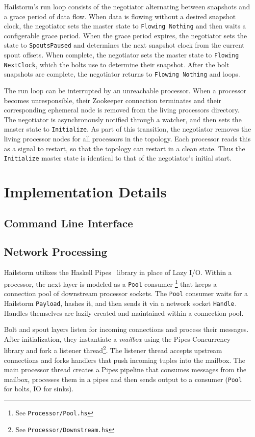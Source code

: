 \documentclass[10pt,nocopyrightspace]{sigplanconf}
\begin{document}
Hailstorm's run loop consists of the negotiator alternating between snapshots
and a grace period of data flow. When data is flowing without a desired snapshot
clock, the negotiator sets the master state to \texttt{Flowing Nothing} and
then waits a configerable grace period. When the grace period expires, the
negotiator sets the state to \texttt{SpoutsPaused} and determines the next
snapshot clock from the current spout offsets. When complete, the negotiator sets
the master state to \texttt{Flowing NextClock}, which the bolts use to determine
their snapshot. After the bolt snapshots are complete, the negotiator returns to
\texttt{Flowing Nothing} and loops.

The run loop can be interrupted by an unreachable processor. When a processor
becomes unresponsible, their Zookeeper connection terminates and their
corresponding ephemeral node is removed from the living processors directory.
The negotiator is asynchronously notified through a watcher, and then sets the
master state to \texttt{Initialize}. As part of this transition, the negotiator
removes the living processor nodes for all processors in the topology. Each
processor reads this as a signal to restart, so that the topology can restart in
a clean state. Thus the \texttt{Initialize} master state is identical to that of
the negotiator's initial start.

\section{Implementation Details}
\subsection{Command Line Interface}

\subsection{Network Processing}
Hailstorm utilizes the Haskell Pipes~\cite{pipes} library
in place of Lazy I/O. Within
a processor, the next layer is modeled as a \texttt{Pool} consumer%
\footnote{See \texttt{Processor/Pool.hs}} that keeps a connection pool
of downstream processor sockets. The \texttt{Pool} consumer waits for a
Hailstorm \texttt{Payload}, hashes it, and then sends it via a network socket
\texttt{Handle}. Handles themselves are lazily created and maintained within a
connection pool.

Bolt and spout layers listen for incoming connections and process their
messages. After initialization, they instantiate a \textit{mailbox} using the
Pipes-Concurrency~\cite{pipes-concurrency} library and fork a listener
thread\footnote{See \texttt{Processor/Downstream.hs}}. The listener thread
accepts upstream connections and forks handlers that push incoming tuples
into the mailbox. The main processor thread creates a Pipes pipeline that
consumes messages from the mailbox, processes them in a pipes
and then sends output to a consumer (\texttt{Pool} for bolts,
IO for sinks).
\end{document}
